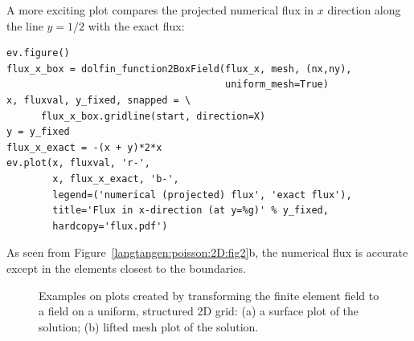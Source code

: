 A more exciting plot compares the projected numerical flux in
$x$ direction along the
line $y=1/2$ with the exact flux:
\begin{Verbatim}[fontsize=\fontsize{10pt}{10pt},tabsize=8,baselinestretch=1.05,
fontfamily=tt,xleftmargin=7mm]
ev.figure()
flux_x_box = dolfin_function2BoxField(flux_x, mesh, (nx,ny),
                                      uniform_mesh=True)
x, fluxval, y_fixed, snapped = \
      flux_x_box.gridline(start, direction=X)
y = y_fixed
flux_x_exact = -(x + y)*2*x
ev.plot(x, fluxval, 'r-',
        x, flux_x_exact, 'b-',
        legend=('numerical (projected) flux', 'exact flux'),
        title='Flux in x-direction (at y=%g)' % y_fixed,
        hardcopy='flux.pdf')
\end{Verbatim}
\noindent
As seen from Figure~\ref{langtangen:poisson:2D:fig2}b, the numerical flux
is accurate except in the elements closest to the boundaries.

\begin{figure}
  \begin{center}
    \centerline{
      }
    \centerline{
      }
    \caption{Examples on plots created by transforming the finite element field to
      a field on a uniform, structured 2D grid:
      (a) a surface plot of the solution; (b) lifted mesh plot of the solution.
    }
    \label{langtangen:poisson:2D:fig3}
  \end{center}
\end{figure}

